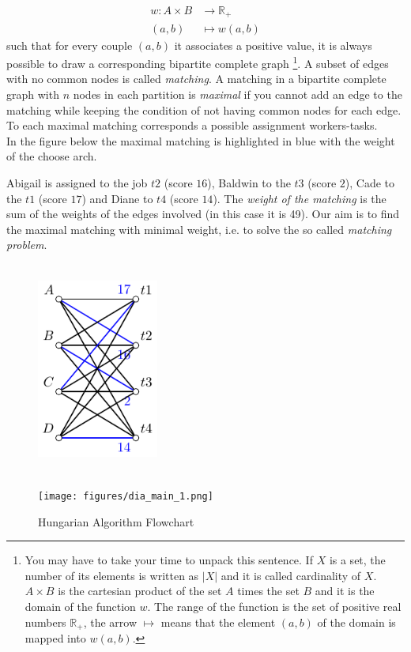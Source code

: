 \documentclass[12pt]{ClasseMatematicamente}
\begin{document}
\begin{align*}
  w : A \times B  &\longrightarrow  \mathbb{R}_{+} \\
   (a,b) &\longmapsto w(a,b) 
\end{align*}
such that for every couple $(a,b)$ it associates a positive value,
it is always possible to draw a corresponding bipartite complete graph
\footnote{You may have to take your time to unpack this sentence. If $X$ is a set, the number of its elements is written as $\vert X \vert$ and it is called cardinality of $X$. $A \times B$ is the cartesian product of the set $A$ times the set $B$ and it is the domain of the function $w$. The range of the function is the set of positive real numbers $ \mathbb{R}_{+}$, the arrow $\mapsto$ means that the element $(a,b)$ of the domain is mapped into $w(a,b)$.}. 
A subset of edges with no common nodes is called \emph{matching}. A matching in a bipartite complete graph with $n$ nodes in each partition is \emph{maximal} if you cannot add an edge to the matching while keeping the condition of not having common nodes for each edge. To each maximal matching corresponds a possible assignment workers-tasks. \\
In the figure below the maximal matching is highlighted in blue with the weight of the choose arch. 

\noindent
Abigail is assigned to the job $t2$ (score $16$), Baldwin to the $t3$ (score $2$), Cade to the $t1$ (score $17$) and Diane to $t4$ (score $14$).
The \emph{weight of the matching} is the sum of the weights of the edges involved (in this case it is 49).
Our aim is to find the maximal matching with minimal weight, i.e. to solve the so called \emph{matching problem}.

\begin{figure}[!ht]
	\centering
	\includegraphics[height=7cm, width=4cm, angle=0,
	keepaspectratio]{figures/bipartite_graph_2.pdf}
	\label{fig:bipartite_graph_blue}
\end{figure}
\begin{figure}[!ht]
	\centering
	\texttt{[image: figures/dia\_main\_1.png]}
	\caption{Hungarian Algorithm Flowchart}
	\label{fig:main_flow}
\end{figure}
\end{document}
